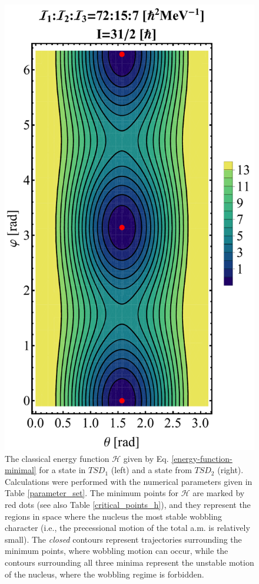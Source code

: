 \documentclass[myclassdoc,debug]{rjparticle}
\begin{document}
\begin{figure}[ht]
\begin{minipage}{.5\textwidth}
 \includegraphics[scale=0.3]{figs/contour-tsd2.pdf}
\end{minipage}
\caption{The classical energy function $\mathcal{H}$ given by Eq. \ref{energy-function-minimal} for a state in $TSD_1$ (left) and a state from $TSD_2$ (right). Calculations were performed with the numerical parameters given in Table \ref{parameter_set}. The minimum points for $\mathcal{H}$ are marked by red dots (see also Table \ref{critical_points_h}), and they represent the regions in space where the nucleus the most stable wobbling character (i.e., the precessional motion of the total a.m. is relatively small). The \emph{closed} contours represent trajectories surrounding the minimum points, where wobbling motion can occur, while the contours surrounding all three minima represent the unstable motion of the nucleus, where the wobbling regime is forbidden.}
    \label{contours-12}
\end{figure}
\end{document}
